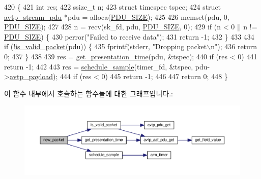 \begin{DoxyCode}
420 \{
421     \textcolor{keywordtype}{int} res;
422     ssize\_t n;
423     \textcolor{keyword}{struct }timespec tspec;
424     \textcolor{keyword}{struct }\hyperlink{structavtp__stream__pdu}{avtp\_stream\_pdu} *pdu = alloca(\hyperlink{aaf-listener_8c_a4bdc13655ee7bf4cf0e66d16e22dc103}{PDU\_SIZE});
425 
426     memset(pdu, 0, \hyperlink{aaf-listener_8c_a4bdc13655ee7bf4cf0e66d16e22dc103}{PDU\_SIZE});
427 
428     n = recv(sk\_fd, pdu, \hyperlink{aaf-listener_8c_a4bdc13655ee7bf4cf0e66d16e22dc103}{PDU\_SIZE}, 0);
429     \textcolor{keywordflow}{if} (n < 0 || n != \hyperlink{aaf-listener_8c_a4bdc13655ee7bf4cf0e66d16e22dc103}{PDU\_SIZE}) \{
430         perror(\textcolor{stringliteral}{"Failed to receive data"});
431         \textcolor{keywordflow}{return} -1;
432     \}
433 
434     \textcolor{keywordflow}{if} (!\hyperlink{aaf-listener_8c_a0f404f938e1dca24ac2365f4c11fe142}{is\_valid\_packet}(pdu)) \{
435         fprintf(stderr, \textcolor{stringliteral}{"Dropping packet\(\backslash\)n"});
436         \textcolor{keywordflow}{return} 0;
437     \}
438 
439     res = \hyperlink{aaf-listener_8c_adcf17f48b1ca0dde610d14b0212c023d}{get\_presentation\_time}(pdu, &tspec);
440     \textcolor{keywordflow}{if} (res < 0)
441         \textcolor{keywordflow}{return} -1;
442 
443     res = \hyperlink{aaf-listener_8c_a4d4e3f1353c49077c865384052a66aa2}{schedule\_sample}(timer\_fd, &tspec, pdu->\hyperlink{structavtp__stream__pdu_af7de5ad9772244bef16d6266d874498d}{avtp\_payload});
444     \textcolor{keywordflow}{if} (res < 0)
445         \textcolor{keywordflow}{return} -1;
446 
447     \textcolor{keywordflow}{return} 0;
448 \}
\end{DoxyCode}


이 함수 내부에서 호출하는 함수들에 대한 그래프입니다.\+:
\nopagebreak
\begin{figure}[H]
\begin{center}
\leavevmode
\includegraphics[width=350pt]{aaf-listener_8c_a17a073ddf3b61d9030710c8da691b0c5_cgraph}
\end{center}
\end{figure}




